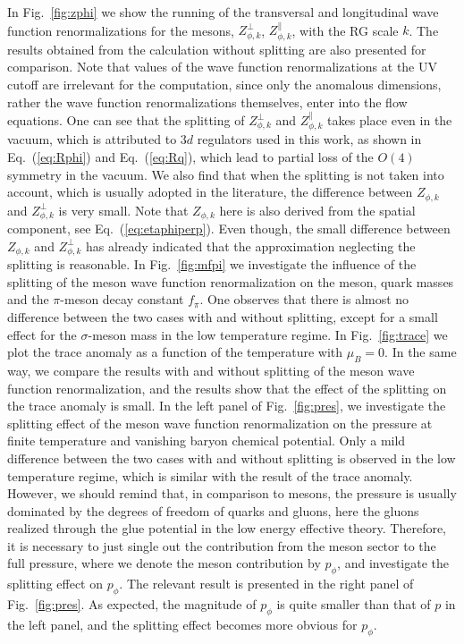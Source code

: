 \documentclass[%
reprint,
superscriptaddress,
showpacs,preprintnumbers,
 amsmath,amssymb,
 aps,
prd,
]{revtex4-1}
\def\Fig#1{Fig.~\ref{#1}} \def\Tab#1{Tab.~\ref{#1}}
\def\Eq#1{Eq.~(\ref{#1})}
\begin{document}
In \Fig{fig:zphi} we show the running of the transversal and longitudinal wave function renormalizations for the mesons, $Z_{\phi,k}^{\perp}$, $Z_{\phi,k}^{\parallel}$, with the RG scale $k$. The results obtained from the calculation without splitting are also presented for comparison. Note that values of the wave function renormalizations at the UV cutoff are irrelevant for the computation, since only the anomalous dimensions, rather the wave function renormalizations themselves, enter into the flow equations. One can see that the splitting of $Z_{\phi,k}^{\perp}$ and $Z_{\phi,k}^{\parallel}$ takes place even in the vacuum, which is attributed to $3d$ regulators used in this work, as shown in \Eq{eq:Rphi} and \Eq{eq:Rq}, which lead to partial loss of the $O(4)$ symmetry in the vacuum. We also find that when the splitting is not taken into account, which is usually adopted in the literature, the difference between $Z_{\phi,k}$ and $Z_{\phi,k}^{\perp}$ is very small. Note that $Z_{\phi,k}$ here is also derived from the spatial component, see \Eq{eq:etaphiperp}. Even though, the small difference between $Z_{\phi,k}$ and $Z_{\phi,k}^{\perp}$ has already indicated that the approximation neglecting the splitting is reasonable. In \Fig{fig:mfpi} we investigate the influence of the splitting of the meson wave function renormalization on the meson, quark masses and the $\pi$-meson decay constant $f_\pi$. One observes that there is almost no difference between the two cases with and without splitting, except for a small effect for the $\sigma$-meson mass in the low temperature regime. In \Fig{fig:trace} we plot the trace anomaly as a function of the temperature with $\mu_B=0$. In the same way, we compare the results with and without splitting of the meson wave function renormalization, and the results show that the effect of the splitting on the trace anomaly is small. In the left panel of \Fig{fig:pres}, we investigate the splitting effect of the meson wave function renormalization on the pressure at finite temperature and vanishing baryon chemical potential. Only a mild difference between the two cases with and without splitting is observed in the low temperature regime, which is similar with the result of the trace anomaly. However, we should remind that, in comparison to mesons, the pressure is usually dominated by the degrees of freedom of quarks and gluons, here the gluons realized through the glue potential in the low energy effective theory. Therefore, it is necessary to just single out the contribution from the meson sector to the full pressure, where we denote the meson contribution by $p_\phi$, and investigate the splitting effect on $p_\phi$. The relevant result is presented in the right panel of \Fig{fig:pres}. As expected, the magnitude of $p_\phi$ is quite smaller than that of $p$ in the left panel, and the splitting effect becomes more obvious for $p_\phi$.
\end{document}
